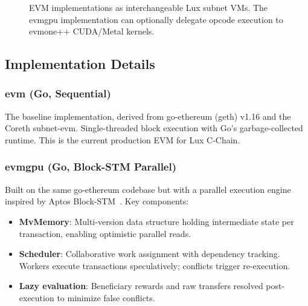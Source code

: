 \documentclass[11pt,twocolumn]{article}
\begin{document}
\begin{figure}[h]
\centering
{}
\caption{EVM implementations as interchangeable Lux subnet VMs.
The evmgpu implementation can optionally delegate opcode execution to evmone++ CUDA/Metal kernels.}
\label{fig:arch}
\end{figure}

\subsection{Implementation Details}

\subsubsection{evm (Go, Sequential)}
The baseline implementation, derived from go-ethereum (geth) v1.16 and the Coreth
subnet-evm. Single-threaded block execution with Go's garbage-collected runtime.
This is the current production EVM for Lux C-Chain.

\subsubsection{evmgpu (Go, Block-STM Parallel)}
Built on the same go-ethereum codebase but with a parallel execution engine inspired
by Aptos Block-STM~\cite{blockstm}. Key components:
\begin{itemize}
\item \textbf{MvMemory}: Multi-version data structure holding intermediate state
      per transaction, enabling optimistic parallel reads.
\item \textbf{Scheduler}: Collaborative work assignment with dependency tracking.
      Workers execute transactions speculatively; conflicts trigger re-execution.
\item \textbf{Lazy evaluation}: Beneficiary rewards and raw transfers resolved
      post-execution to minimize false conflicts.
\end{itemize}
\end{document}
